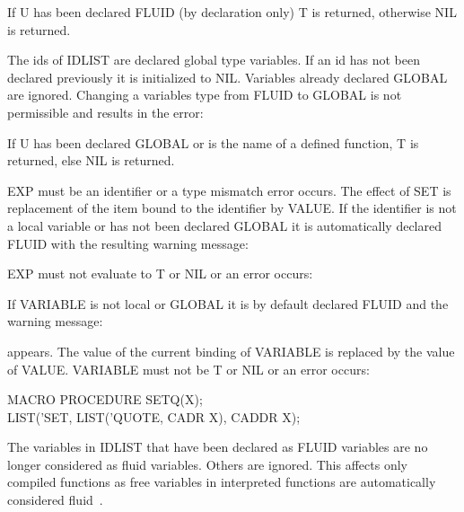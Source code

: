 {If U has been declared FLUID (by declaration only) T is returned,
otherwise NIL is returned.}


{The ids of IDLIST are declared global type variables. If an id has
not been declared previously it is initialized to NIL. Variables
already declared GLOBAL are ignored. Changing a variables type from
FLUID to GLOBAL is not permissible and results in the error:

}


{If U has been declared GLOBAL or is the name of a defined function, T
is returned, else NIL is returned.}


{EXP must be an identifier or a type mismatch error occurs. The effect
of SET is replacement of the item bound to the identifier by VALUE.
If the identifier is not a local variable or has not been declared
GLOBAL it is automatically declared FLUID with the resulting warning
message:


EXP must not evaluate to T or NIL or an error occurs:
 

}

{If VARIABLE is not local or GLOBAL it is by default declared FLUID
and the warning message:


appears. The value of the current binding of VARIABLE is replaced by
the value of VALUE. VARIABLE must not be T or NIL or an error occurs:
 


{\tt \begin{tabbing} MACRO PROCEDURE SETQ(X); \\
\hspace*{1em} LIST('SET, LIST('QUOTE, CADR X), CADDR X);
\end{tabbing}}
}

{The variables in IDLIST that have been declared as FLUID variables
are no longer considered as fluid variables. Others are ignored. This
affects only compiled functions as free variables in interpreted
functions are automatically considered fluid~\cite{PLC}.
}


